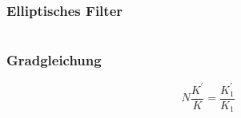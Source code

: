 \documentclass[ngerman, aspectratio=169, xcolor={rgb}]{beamer}
\begin{document}
	\begin{frame}
		\frametitle{Elliptisches Filter}

		\begin{columns}

			\begin{column}[T]{0.5\textwidth}

				\begin{center}
					\resizebox{\textwidth}{!}{
					
					}
				\end{center}

			\end{column}
			\begin{column}[T]{0.5\textwidth}

				\begin{center}
					\resizebox{\textwidth}{!}{
					
					}
				\end{center}

			\end{column}
		\end{columns}

	\end{frame}

	\begin{frame}
		\frametitle{Gradgleichung}

		\begin{equation}
			N \frac{K^\prime}{K} = \frac{K^\prime_1}{K_1}
		\end{equation}

	\end{frame}

	
\end{document}
